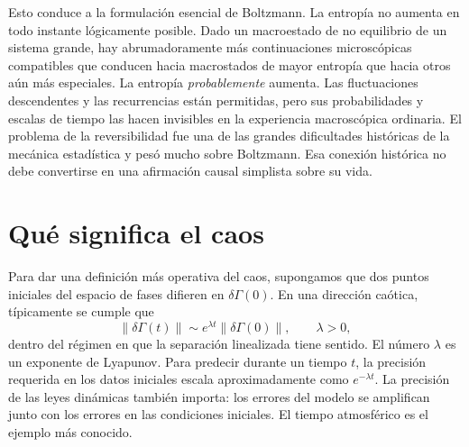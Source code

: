 \begin{classroomqa}
\end{classroomqa}

\begin{classroomqa}
\end{classroomqa}

Esto conduce a la formulación esencial de Boltzmann. La entropía no aumenta en todo instante lógicamente posible. Dado un macroestado de no equilibrio de un sistema grande, hay abrumadoramente más continuaciones microscópicas compatibles que conducen hacia macrostados de mayor entropía que hacia otros aún más especiales. La entropía \emph{probablemente} aumenta. Las fluctuaciones descendentes y las recurrencias están permitidas, pero sus probabilidades y escalas de tiempo las hacen invisibles en la experiencia macroscópica ordinaria. El problema de la reversibilidad fue una de las grandes dificultades históricas de la mecánica estadística y pesó mucho sobre Boltzmann. Esa conexión histórica no debe convertirse en una afirmación causal simplista sobre su vida.

\section{Qué significa el caos}

Para dar una definición más operativa del caos, supongamos que dos puntos iniciales del espacio de fases difieren en \(\delta\Gamma(0)\). En una dirección caótica, típicamente se cumple que
\begin{equation}
 \lVert\delta\Gamma(t)\rVert
 \sim e^{\lambda t}\lVert\delta\Gamma(0)\rVert,
 \qquad \lambda>0,
 \label{eq:sm7-lyapunov-growth}
\end{equation}
dentro del régimen en que la separación linealizada tiene sentido. El número \(\lambda\) es un exponente de Lyapunov. Para predecir durante un tiempo \(t\), la precisión requerida en los datos iniciales escala aproximadamente como \(e^{-\lambda t}\). La precisión de las leyes dinámicas también importa: los errores del modelo se amplifican junto con los errores en las condiciones iniciales. El tiempo atmosférico es el ejemplo más conocido.

